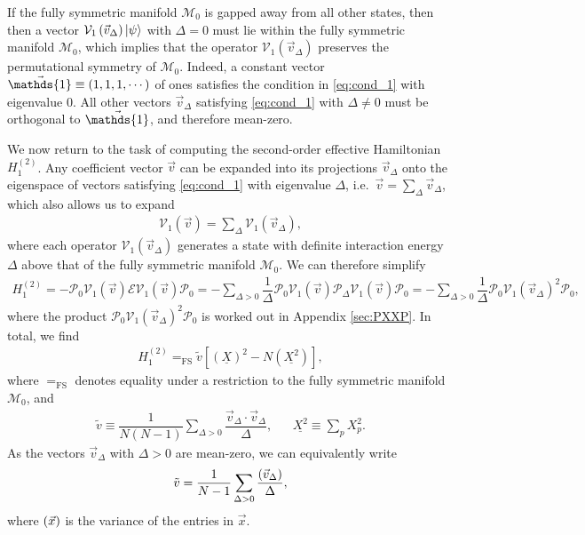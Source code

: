 \documentclass[nofootinbib,notitlepage,11pt]{revtex4-2}
\newcommand{\f}[2]{\dfrac{#1}{#2}} %
\newcommand{\p}[1]{\left(#1\right)} %
\renewcommand{\sp}[1]{\left[#1\right]} %
\renewcommand{\c}{\cdot} %
\renewcommand{\v}{\vec} %
\newcommand{\1}{\mathds{1}}
\newcommand{\E}{\mathcal{E}}
\newcommand{\M}{\mathcal{M}}
\renewcommand{\P}{\mathcal{P}}
\newcommand{\V}{\mathcal{V}}
\newcommand{\EQFS}{=_{\text{FS}}}
\newcommand{\col}{\underline}
\let\var\relax
\DeclareMathOperator{\var}{var}
\begin{document}
If the fully symmetric manifold $\M_0$ is gapped away from all other
states, then then a vector $\V_1\p{\v v_\Delta}\ket\psi$ with
$\Delta=0$ must lie within the fully symmetric manifold $\M_0$, which
implies that the operator $\V_1\p{\v v_\Delta}$ preserves the
permutational symmetry of $\M_0$.  Indeed, a constant vector
$\v\1\equiv\p{1,1,1,\cdots}$ of ones satisfies the condition in
\eqref{eq:cond_1} with eigenvalue $0$.  All other vectors
$\v v_\Delta$ satisfying \eqref{eq:cond_1} with $\Delta\ne0$ must be
orthogonal to $\v\1$, and therefore mean-zero.

We now return to the task of computing the second-order effective
Hamiltonian $H_1^{(2)}$.  Any coefficient vector $\v v$ can be
expanded into its projections $\v v_\Delta$ onto the eigenspace of
vectors satisfying \eqref{eq:cond_1} with eigenvalue $\Delta$,
i.e.~$\v v = \sum_\Delta \v v_\Delta$, which also allows us to expand
\begin{align}
  \V_1\p{\v v} = \sum_\Delta \V_1\p{\v v_\Delta},
\end{align}
where each operator $\V_1\p{\v v_\Delta}$ generates a state with
definite interaction energy $\Delta$ above that of the fully symmetric
manifold $\M_0$.  We can therefore simplify
\begin{align}
  H_1^{(2)}
  = - \P_0 \V_1\p{\v v} \E \V_1\p{\v v} \P_0
  = - \sum_{\Delta>0} \f1{\Delta}
  \P_0 \V_1\p{\v v} \P_\Delta \V_1\p{\v v} \P_0
  = - \sum_{\Delta>0} \f1{\Delta} \P_0 \V_1\p{\v v_\Delta}^2 \P_0,
\end{align}
where the product $\P_0 \V_1\p{\v v_\Delta}^2 \P_0$ is worked out in
Appendix \ref{sec:PXXP}.  In total, we find
\begin{align}
  H_1^{(2)} \EQFS \tilde v \sp{\p{\col{X}}^2 - N \p{\col{X^2}}},
  \label{eq:H_1_2}
\end{align}
where $\EQFS$ denotes equality under a restriction to the fully
symmetric manifold $\M_0$, and
\begin{align}
  \tilde v \equiv \f1{N\p{N-1}}
  \sum_{\Delta>0} \f{\v v_\Delta\c\v v_\Delta}{\Delta},
  &&
  \col{X^2} \equiv \sum_p X_p^2.
\end{align}
As the vectors $\v v_\Delta$ with $\Delta>0$ are mean-zero, we can
equivalently write
\begin{align}
  \tilde v = \f1{N-1}
  \sum_{\Delta>0} \f{\var\p{\v v_\Delta}}{\Delta},
\end{align}
where $\var\p{\v x}$ is the variance of the entries in $\v x$.

\end{document}
